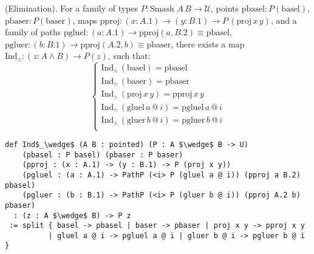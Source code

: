 \documentclass{article}
\begin{document}
\begin{theorem} (Elimination).
For a family of types \( P : \text{Smash } A \, B \to \mathcal{U} \),
points \( \text{pbasel} : P(\text{basel}) \),
         \( \text{pbaser} : P(\text{baser}) \), maps
\( \text{pproj} : (x : A.1) \to (y : B.1) \to P \, (\text{proj} \, x \, y) \),
and a family of paths
\( \text{pgluel} : (a : A.1) \to \text{pproj}(a,B.2) \equiv \text{pbasel} \),
\( \text{pgluer} : (b : B.1) \to \text{pproj}(A.2,b) \equiv \text{pbaser} \),
there exists a map \( \text{Ind}_\wedge : (z : A \wedge B) \to P(z) \), such that:
\[
\begin{cases}
\text{Ind}_\wedge \, (\text{basel}) = \text{pbasel} \\
\text{Ind}_\wedge \, (\text{baser}) = \text{pbaser} \\
\text{Ind}_\wedge \, (\text{proj} \, x \, y) = \text{pproj} \, x \, y \\
\text{Ind}_\wedge \, (\text{gluel} \, a \, @ \, i) = \text{pgluel} \, a \, @ \, i \\
\text{Ind}_\wedge \, (\text{gluer} \, b \, @ \, i) = \text{pgluer} \, b \, @ \, i \\
\end{cases}
\]
\begin{lstlisting}[mathescape=true]
def Ind$_\wedge$ (A B : pointed) (P : A $\wedge$ B -> U)
    (pbasel : P basel) (pbaser : P baser)
    (pproj : (x : A.1) -> (y : B.1) -> P (proj x y))
    (pgluel : (a : A.1) -> PathP (<i> P (gluel a @ i)) (pproj a B.2) pbasel)
    (pgluer : (b : B.1) -> PathP (<i> P (gluer b @ i)) (pproj A.2 b) pbaser)
  : (z : A $\wedge$ B) -> P z
 := split { basel -> pbasel | baser -> pbaser | proj x y -> pproj x y
          | gluel a @ i -> pgluel a @ i | gluer b @ i -> pgluer b @ i }
\end{lstlisting}
\end{theorem}
\end{document}
